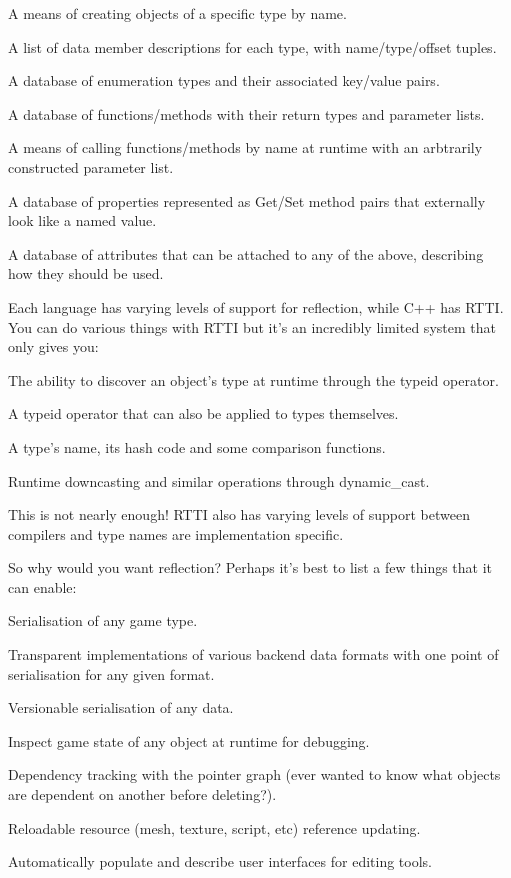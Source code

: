 \documentclass{book}
\begin{document}
    A means of creating objects of a specific type by name.

    A list of data member descriptions for each type, with name/type/offset tuples.

    A database of enumeration types and their associated key/value pairs.

    A database of functions/methods with their return types and parameter lists.

    A means of calling functions/methods by name at runtime with an arbtrarily constructed parameter list.

    A database of properties represented as Get/Set method pairs that externally look like a named value.

    A database of attributes that can be attached to any of the above, describing how they should be used.

Each language has varying levels of support for reflection, while C++ has RTTI. You can do various things with RTTI but it’s an incredibly limited system that only gives you:

    The ability to discover an object’s type at runtime through the typeid operator.

    A typeid operator that can also be applied to types themselves.

    A type’s name, its hash code and some comparison functions.

    Runtime downcasting and similar operations through dynamic\_cast.

This is not nearly enough! RTTI also has varying levels of support between compilers and type names are implementation specific.

So why would you want reflection? Perhaps it’s best to list a few things that it can enable:

    Serialisation of any game type.

    Transparent implementations of various backend data formats with one point of serialisation for any given format.

    Versionable serialisation of any data.

    Inspect game state of any object at runtime for debugging.

    Dependency tracking with the pointer graph (ever wanted to know what objects are dependent on another before deleting?).

    Reloadable resource (mesh, texture, script, etc) reference updating.

    Automatically populate and describe user interfaces for editing tools.
\end{document}
